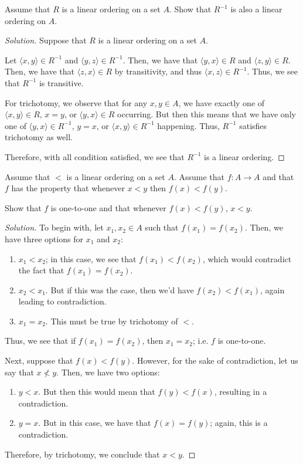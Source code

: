\documentclass{article}
\newenvironment{solution}{\begin{proof}[Solution]}{\end{proof}}
\newcommand{\ang}[1]{\langle {#1} \rangle}
\begin{document}
	\begin{hw}{43}
		Assume that $R$ is a linear ordering on a set $A$. Show that $R^{-1}$ is also a linear ordering on $A$.
	\end{hw}
	\begin{solution}
		Suppose that $R$ is a linear ordering on a set $A$.
		
		Let $\ang{x,y} \in R^{-1}$ and $\ang{y,z} \in R^{-1}$. Then, we have that $\ang{y,x} \in R$ and $\ang{z,y} \in R$. Then, we have that $\ang{z,x} \in R$ by transitivity, and thus $\ang{x,z} \in R^{-1}$. Thus, we see that $R^{-1}$ is transitive.
		
		For trichotomy, we observe that for any $x,y \in A$, we have exactly one of $\ang{x,y}\in R$, $x = y$, or $\ang{y,x} \in R$ occurring. But then this means that we have only one of $\ang{y,x} \in R^{-1}$, $y = x$, or $\ang{x,y} \in R^{-1}$ happening. Thus, $R^{-1}$ satisfies trichotomy as well.
		
		Therefore, with all condition satisfied, we see that $R^{-1}$ is a linear ordering.
	\end{solution}

	\begin{hw}{44}
		Assume that $<$ is a linear ordering on a set $A$. Assume that $f : A \rightarrow A$ and that $f$ has the property that whenever $x < y$ then $f(x) < f(y)$.
		
		Show that $f$ is one-to-one and that whenever $f(x) < f(y)$, $x < y$.
	\end{hw}
	\begin{solution}
		To begin with, let $x_{1}, x_{2} \in A$ such that $f(x_{1}) = f(x_{2})$. Then, we have three options for $x_{1}$ and $x_{2}$:
		\begin{enumerate}
			\item $x_{1} < x_{2}$; in this case, we see that $f(x_{1}) < f(x_{2})$, which would contradict the fact that $f(x_{1}) = f(x_{2})$.
			\item $x_{2} < x_{1}$. But if this was the case, then we'd have $f(x_{2}) < f(x_{1})$, again leading to contradiction.
			\item $x_{1} = x_{2}$. This must be true by trichotomy of $<$.
		\end{enumerate}
	
		Thus, we see that if $f(x_{1}) = f(x_{2})$, then $x_{1} = x_{2}$; i.e. $f$ is one-to-one.
		
		Next, suppose that $f(x) < f(y)$. However, for the sake of contradiction, let us say that $x \not< y$. Then, we have two options:
		\begin{enumerate}
			\item $y < x$. But then this would mean that $f(y) < f(x)$, resulting in a contradiction.
			\item $y = x$. But in this case, we have that $f(x) = f(y)$; again, this is a contradiction.
		\end{enumerate}
	
		Therefore, by trichotomy, we conclude that $x < y$.
	\end{solution}
\end{document}
